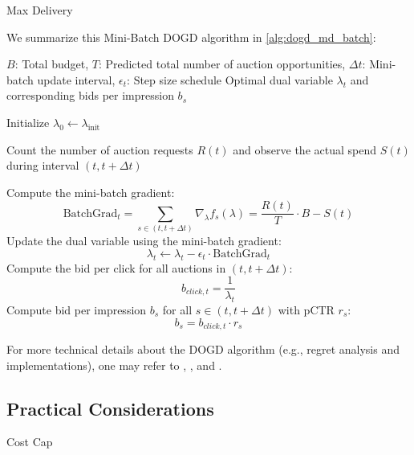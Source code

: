 \documentclass[../main.tex]{subfiles}
\begin{document}
\begin{section}{Max Delivery}
	
	We summarize this Mini-Batch DOGD algorithm in \autoref{alg:dogd_md_batch}:

	\begin{algorithm}[H]
		\caption{Mini-Batch DOGD for Max Delivery Problem}
		\label{alg:dogd_md_batch}
		\begin{algorithmic}[1]
			\Require $B$: Total budget, $T$: Predicted total number of auction opportunities, $\Delta t$: Mini-batch update interval, $\epsilon_t$: Step size schedule
			\Ensure Optimal dual variable $\lambda_t$ and corresponding bids per impression $b_s$
			
			\State Initialize $\lambda_0 \gets \lambda_{\text{init}}$ 
			
			 
			\State Count the number of auction requests \(R(t)\) and observe the actual spend $S(t)$ during interval \((t, t+\Delta t)\)
			
			\State Compute the mini-batch gradient:
			\[
			\text{BatchGrad}_t = \sum_{ s \in (t, t+\Delta t)} \nabla_{\lambda} f_s(\lambda) = \frac{R(t)}{T} \cdot B - S(t)
			\]
			\State Update the dual variable using the mini-batch gradient:
			\[
			\lambda_t \gets \lambda_t - \epsilon_t \cdot \text{BatchGrad}_t 
			\]
			\State Compute the bid per click for all auctions in \((t, t+\Delta t)\):
			\[
			b_{click, t} = \frac{1}{\lambda_t}
			\]
			\State Compute bid per impression $b_s$ for all $s \in (t, t+\Delta t)$ with pCTR $r_s$:
			\[
			b_s = b_{click, t} \cdot r_s
			\]
			\EndFor
		
		\end{algorithmic}
	\end{algorithm}
	
	
	For more technical details about the DOGD algorithm (e.g., regret analysis and implementations), one may refer to \cite{balseiro2020dual}, \cite{balseiro2019learning}, and \cite{gao2022bidding}.

	
	\subsection*{Practical Considerations} 
	
	
	\end{section}

	\begin{section}{Cost Cap}
		 \cite{gao2022bidding}
	\end{section}
	
\end{document}
